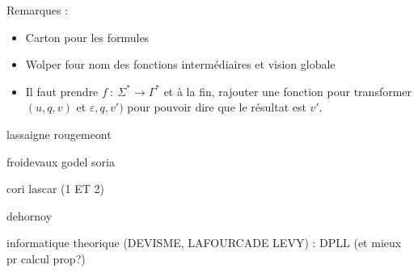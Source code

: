 \documentclass[../agregation.tex]{subfiles}
\begin{document}
Remarques :
\begin{itemize}
	\item Carton pour les formules
	\item Wolper four nom des fonctions intermédiaires et vision globale
	\item Il faut prendre $f~:~\Sigma^* \to \Gamma^*$ et à la fin, rajouter une fonction pour transformer $(u, q, v)$ et $\varepsilon, q, v')$ pour pouvoir dire que le résultat est $v'$.
\end{itemize}









\printbibliography[segment=1,resetnumbers]

lassaigne rougemeont

froidevaux godel soria

cori lascar (1 ET 2)

dehornoy

informatique theorique (DEVISME, LAFOURCADE LEVY) : DPLL (et mieux pr calcul prop?)
\end{document}
